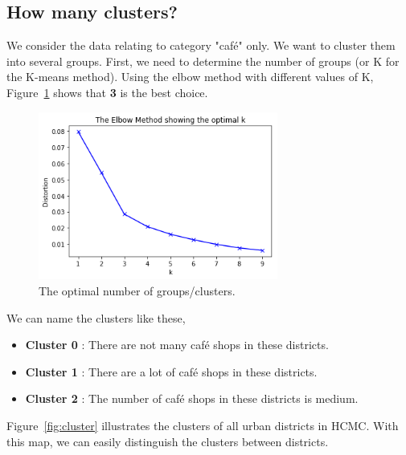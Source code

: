 \documentclass[12pt,a4paper]{article}
\begin{document}
\subsection{How many clusters?}
\label{sec:cluster}

We consider the data relating to category "café" only. We want to cluster them into several groups. First, we need to determine the number of groups (or K for the K-means method). Using the elbow method with different values of K, Figure~\ref{fig:elbow} shows that \textbf{3} is the best choice.

\begin{center}
    \begin{figure}[htp]
    \begin{center}
     \includegraphics[width=0.7\textwidth]{fig/elbow}
    \end{center}
    \caption{The optimal number of groups/clusters.}
    \label{fig:elbow}
    \end{figure}
\end{center}

We can name the clusters like these,

\begin{itemize}
\item \textbf{Cluster 0} : There are not many café shops in these districts.
\item \textbf{Cluster 1} : There are a lot of café shops in these districts.
\item \textbf{Cluster 2} : The number of café shops in these districts is medium.
\end{itemize}

Figure~\ref{fig:cluster} illustrates the clusters of all urban districts in HCMC. With this map, we can easily distinguish the clusters between districts.
\end{document}

